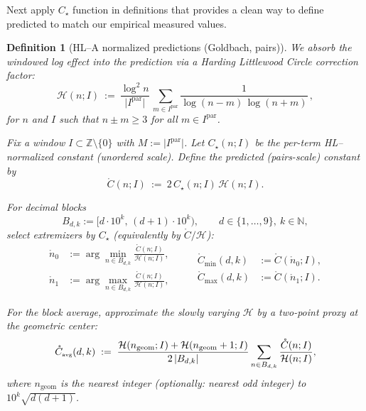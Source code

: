 \documentclass[11pt]{article}
\DeclarePairedDelimiter{\card}{\lvert}{\rvert}
\theoremstyle{inline}
\theoremstyle{break}
\theoremstyle{break}
\theoremstyle{break}
\theoremstyle{break}
\theoremstyle{break}
\newtheorem{definition}{Definition}
\theoremstyle{inline}
\newcommand{\tavg}{{\scriptscriptstyle\mathrm{avg}}}
\newcommand{\Cpred}{\mathring{C}}   %
\newcommand{\Npred}{\mathring{n}}   %
\newcommand{\Ipar}{I^{\mathrm{par}}}
\newcommand{\Ngeom}{n_\mathrm{geom}}
\newcommand{\HLCorr}{\mathcal{H}}
\begin{document}
Next apply \( C_\star \) function in definitions that provides a clean way to define predicted to match our empirical measured values.

\begin{definition}[HL–A normalized predictions (Goldbach, pairs)]
We absorb the windowed log effect into the prediction via a Harding Littlewood Circle correction factor:
\begin{equation}
\HLCorr(n;I)\ :=\ \frac{\log^2 n}{\lvert \Ipar\rvert}\,
\sum_{m\in \Ipar}\frac{1}{\log(n-m)\,\log(n+m)}\,,
\end{equation}
for \(n\) and \(I\) such that \(n\pm m\ge 3\) for all \(m\in\Ipar\).

Fix a window \(I\subset\mathbb Z\setminus\{0\}\) with \(M:=\lvert\Ipar\rvert\).
Let \(C_\star(n;I)\) be the per-term HL–normalized constant (unordered scale).
Define the \emph{predicted (pairs-scale) constant} by
\begin{equation}
\Cpred(n;I)\ :=\ 2\,C_\star(n;I)\,\HLCorr(n;I).
\end{equation}

For decimal blocks
\begin{equation}
B_{d,k}:=\big[d\cdot10^k,\,(d+1)\cdot10^k\big),\qquad d\in\{1,\dots,9\},\ k\in\mathbb N,
\end{equation}
select extremizers by \(C_\star\) (equivalently by \(\Cpred/\HLCorr\)):
\begin{equation}
\begin{aligned}
\Npred_0 &:= \arg\min_{n\in B_{d,k}} \frac{\Cpred(n;I)}{\HLCorr(n;I)}, \\
\Npred_1 &:= \arg\max_{n\in B_{d,k}} \frac{\Cpred(n;I)}{\HLCorr(n;I)},
\end{aligned}
\qquad
\begin{aligned}
\Cpred_{\min}(d,k) &:= \Cpred(\Npred_0;I),\\
\Cpred_{\max}(d,k) &:= \Cpred(\Npred_1;I).
\end{aligned}
\end{equation}

For the block average, approximate the slowly varying \(\HLCorr\) by a two-point
proxy at the geometric center:
\begin{equation}
\Cpred_{\tavg}(d,k)
\;:=\;
\frac{\HLCorr(\Ngeom;I)+\HLCorr(\Ngeom+1;I)}{2\,\card{B_{d,k}}}
\sum_{n\in B_{d,k}} \frac{\Cpred(n;I)}{\HLCorr(n;I)},
\end{equation}
where \(\Ngeom\) is the nearest integer (optionally: nearest \emph{odd} integer) to \(10^k\sqrt{d(d+1)}\).
\end{definition}
\end{document}
